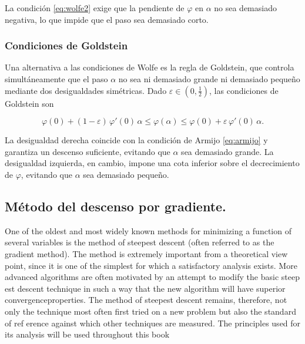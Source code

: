 \documentclass[11pt]{article}
\theoremstyle{ejstyle}
\theoremstyle{ejstyle}
\theoremstyle{ejstyle}
\theoremstyle{ejstyle}
\theoremstyle{ejstyle}
\theoremstyle{ejstyle}
\theoremstyle{ejstyle}
\begin{document}
	La condición \eqref{eq:wolfe2} exige que la pendiente de $\varphi$ en $\alpha$ no sea demasiado negativa, lo que impide que el paso sea demasiado corto.
	
	
	\subsubsection{Condiciones de Goldstein}
	
	Una alternativa a las condiciones de Wolfe es la regla de Goldstein, que controla simultáneamente que el paso $\alpha$ no sea ni demasiado grande ni demasiado pequeño mediante dos desigualdades simétricas. Dado $\varepsilon \in (0, \tfrac{1}{2})$, las condiciones de Goldstein son
	
	\begin{equation}
		\varphi(0) + (1-\varepsilon)\,\varphi'(0)\,\alpha 
		\leq \varphi(\alpha) \leq 
		\varphi(0) + \varepsilon\,\varphi'(0)\,\alpha.
		\label{eq:goldstein}
	\end{equation}
	
	La desigualdad derecha coincide con la condición de Armijo \eqref{eq:armijo} y garantiza un descenso suficiente, evitando que $\alpha$ sea demasiado grande. La desigualdad izquierda, en cambio, impone una cota inferior sobre el decrecimiento de $\varphi$, evitando que $\alpha$ sea demasiado pequeño.
	
	\subsection{Método del descenso por gradiente.}
	
	One of the oldest and most widely known methods for minimizing a function
	of several variables is the method of steepest descent (often referred to as the
	gradient method). The method is extremely important from a theoretical view
	point, since it is one of the simplest for which a satisfactory analysis exists. More
	advanced algorithms are often motivated by an attempt to modify the basic steep
	est descent technique in such a way that the new algorithm will have superior
	convergenceproperties. The method of steepest descent remains, therefore, not only
	the technique most often first tried on a new problem but also the standard of ref
	erence against which other techniques are measured. The principles used for its
	analysis will be used throughout this book
	
	
	
\end{document}
